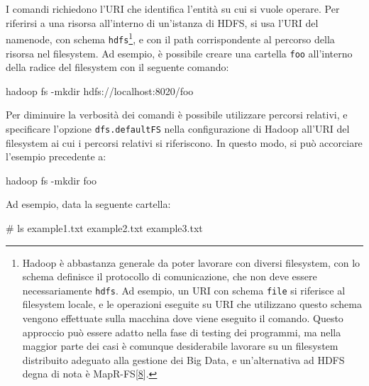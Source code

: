 \documentclass[italian,a4paper, twoside, 12pt]{report}
\newenvironment{Shaded}{}{}
\newcommand{\ExtensionTok}[1]{#1}
\newcommand{\NormalTok}[1]{#1}
\begin{document}
I comandi richiedono l'URI che identifica l'entità su cui si vuole
operare. Per riferirsi a una risorsa all'interno di un'istanza di HDFS,
si usa l'URI del namenode, con schema \texttt{hdfs}\footnote{Hadoop è
  abbastanza generale da poter lavorare con diversi filesystem, con lo
  schema definisce il protocollo di comunicazione, che non deve essere
  necessariamente \texttt{hdfs}. Ad esempio, un URI con schema
  \texttt{file} si riferisce al filesystem locale, e le operazioni
  eseguite su URI che utilizzano questo schema vengono effettuate sulla
  macchina dove viene eseguito il comando. Questo approccio può essere
  adatto nella fase di testing dei programmi, ma nella maggior parte dei
  casi è comunque desiderabile lavorare su un filesystem distribuito
  adeguato alla gestione dei Big Data, e un'alternativa ad HDFS degna di
  nota è MapR-FS{[}\protect\hyperlink{ref-mapr-fs}{8}{]}.}, e con il
path corrispondente al percorso della risorsa nel filesystem. Ad
esempio, è possibile creare una cartella \texttt{foo} all'interno della
radice del filesystem con il seguente comando:

\begin{Shaded}
\begin{Highlighting}[]
\ExtensionTok{hadoop}\NormalTok{ fs -mkdir hdfs://localhost:8020/foo}
\end{Highlighting}
\end{Shaded}

Per diminuire la verbosità dei comandi è possibile utilizzare percorsi
relativi, e specificare l'opzione \texttt{dfs.defaultFS} nella
configurazione di Hadoop all'URI del filesystem ai cui i percorsi
relativi si riferiscono. In questo modo, si può accorciare l'esempio
precedente a:

\begin{Shaded}
\begin{Highlighting}[]
\ExtensionTok{hadoop}\NormalTok{ fs -mkdir foo}
\end{Highlighting}
\end{Shaded}

Ad esempio, data la seguente cartella:

\begin{Shaded}
\begin{Highlighting}[]
\NormalTok{[}\ExtensionTok{root@sandbox}\NormalTok{ example_data]# ls}
\ExtensionTok{example1.txt}\NormalTok{  example2.txt  example3.txt}
\end{Highlighting}
\end{Shaded}
\end{document}
